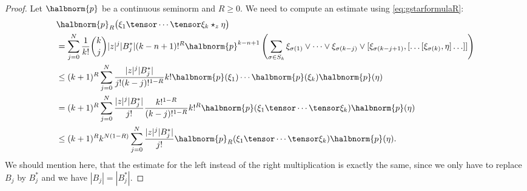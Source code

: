 \documentclass[
11pt,                          %
english                        %
]{article}
\begin{document}
\begin{proof}
	Let $\halbnorm{p}$ be a continuous seminorm and $R \geq 0$. We need to
	compute an estimate using \eqref{eq:gstarformulaR}:
	\begin{align*}
		&
		\halbnorm{p}_R
		\big(
			\xi_1 \tensor \cdots \tensor \xi_k \star_z \eta
		\big)
		\\
		&=
	    \sum\limits_{j=0}^N
        \frac{1}{k!} \binom{k}{j}
        |z|^j |B_j^*|
        (k - n + 1)!^R
        \halbnorm{p}^{k - n + 1}
        \left(
            \sum\limits_{\sigma \in S_k}
            \xi_{\sigma(1)} \vee \cdots \vee \xi_{\sigma(k - j)} \vee
            [\xi_{\sigma(k - j + 1)},
            [ \ldots [\xi_{\sigma(k)}, \eta] \ldots ]
            ]
        \right)
        \\
        & \leq
        (k + 1)^R
	    \sum\limits_{j=0}^N
        \frac{|z|^j |B_j^*|}{j! (k-j)!^{1-R}}
        k! 
        \halbnorm{p}(\xi_1) \cdots \halbnorm{p}(\xi_k)
        \halbnorm{p}(\eta)
        \\
        & =
        (k + 1)^R
	    \sum\limits_{j=0}^N
        \frac{|z|^j |B_j^*|}{j!}
        \frac{k!^{1 - R}}{(k-j)!^{1-R}}
        k!^R
        \halbnorm{p}(\xi_1 \tensor \cdots \tensor \xi_k)
        \halbnorm{p}(\eta)
        \\
        & \leq
        (k + 1)^R
        k^{N (1-R)}
	    \sum\limits_{j=0}^N
        \frac{|z|^j |B_j^*|}{j!}
        \halbnorm{p}_R(\xi_1 \tensor \cdots \tensor \xi_k)
        \halbnorm{p}(\eta).
	\end{align*}
	We should mention here, that the estimate for the left instead of the right
	multiplication is exactly the same, since we only have to replace $B_j$ by 
	$B_j^*$ and we have $|B_j| = |B_j^*|$.
	

\end{proof}
\end{document}
